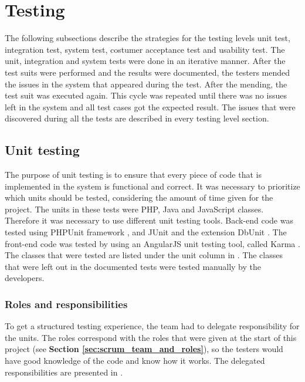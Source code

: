 \chapter{Testing}
\label{chap:testing}

The following subsections describe the strategies for the testing levels unit test, integration test, system test, costumer acceptance test and usability test. 
The unit, integration and system tests were done in an iterative manner. After the test suits were performed and the results were documented, the testers mended the issues in the system that appeared during the test. After the mending, the test suit was executed again. This cycle was repeated until there was no issues left in the system and all test cases got the expected result. The issues that were discovered during all the tests are described in every testing level section. 


\section{Unit testing}
\label{sec:unit_testing}
The purpose of unit testing is to ensure that every piece of code that is implemented in the system is functional and correct. It was necessary to prioritize which units should be tested, considering the amount of time given for the project. 
The units in these tests were PHP, Java and JavaScript classes. Therefore it was necessary to use different unit testing tools. Back-end code was tested using PHPUnit framework \cite{KF2}, and JUnit \cite{jUnit} and the extension DbUnit \cite{dbUnit}. The front-end code was tested by using an AngularJS unit testing tool, called Karma \cite{KF3}. 
The classes that were tested are listed under the unit column in \textbf{}. The classes that were left out in the documented tests were tested manually by the developers.

\subsection{Roles and responsibilities}
To get a structured testing experience, the team had to delegate responsibility for the units. The roles correspond with the roles that were given at the start of this project (see \textbf{Section \ref{sec:scrum_team_and_roles}}), so the testers would have good knowledge of the code and know how it works. The delegated responsibilities are presented in \textbf{}.



